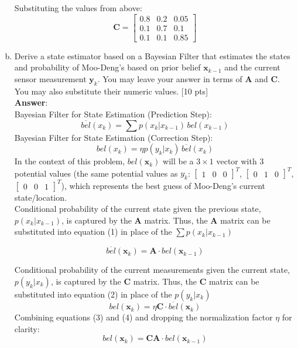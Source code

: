 \begin{enumerate}[a)]
Substituting the values from above:
\[
\mathbf{C} = \begin{bmatrix}
0.8 & 0.2 & 0.05 \\
0.1 & 0.7 & 0.1 \\
0.1 & 0.1 & 0.85
\end{bmatrix}
\]
    \item Derive a state estimator based on a Bayesian Filter that estimates the states and probability of Moo-Deng's  based on prior belief $\mathbf{x}_{k-1}$ and the current sensor measurement $\mathbf{y}_k$. You may leave your answer in terms of $\mathbf{A}$ and $\mathbf{C}$. You may also substitute their numeric values. [10 pts] \\
    \textbf{Answer}: \\
    Bayesian Filter for State Estimation (Prediction Step):
\begin{equation}
    \overline{bel}(x_k) = \sum p(x_k | x_{k-1}) \, bel(x_{k-1})
\end{equation}
Bayesian Filter for State Estimation (Correction Step): \\
\begin{equation} bel(x_k) = \eta p(y_k | x_k) \, \overline{bel}(x_k) \end{equation}
In the context of this problem, $bel(\bm{x}_k)$ will be a $3 \times 1$ vector with 3 potential values (the same potential values as $y_k$: 
        $\begin{bmatrix}
            1 & 0 & 0
        \end{bmatrix}^T$,
        $\begin{bmatrix}
            0 & 1 & 0
        \end{bmatrix}^T$, $\begin{bmatrix}
            0 & 0 & 1
        \end{bmatrix}^T$), 
which represents the best guess of Moo-Deng's current state/location. \\

Conditional probability of the current state given the previous state, $p(x_k | x_{k-1})$, is captured by the $\bm{A}$ matrix. Thus, the $\bm{A}$ matrix can be substituted into equation (1) in place of the $\sum p(x_k | x_{k-1})$

\begin{equation}
    \overline{bel}(\bm{x}_k) = \bm{A} \cdot bel(\bm{x}_{k-1})
\end{equation}

Conditional probability of the current measurements given the current state, $p(y_k | x_k)$, is captured by the $\bm{C}$ matrix. Thus, the $\bm{C}$ matrix can be substituted into equation (2) in place of the $p(y_k | x_k)$
\begin{equation}
    bel(\bm{x}_k) = \eta \bm{C} \cdot \overline{bel}(\bm{x}_k)
\end{equation}
Combining equations (3) and (4) and dropping the normalization factor $\eta$ for clarity:
\begin{equation}
    bel(\bm{x}_k) = \bm{C} \bm{A} \cdot bel(\bm{x}_{k-1})
\end{equation}
\end{enumerate}
